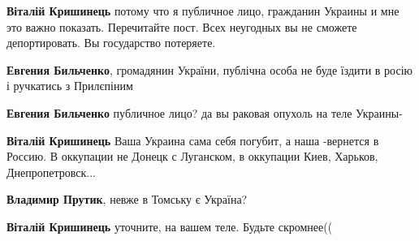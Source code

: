 \begin{itemize}
\begin{itemize}
\textbf{Віталій Кришинець} потому что я публичное лицо, гражданин Украины и мне это важно показать. Перечитайте пост. Всех неугодных вы не сможете депортировать. Вы государство потеряете.

 
\textbf{Евгения Бильченко}, громадянин України, публічна особа не буде їздити в росію і ручкатись з Прилєпіним

 
\textbf{Евгения Бильченко} публичное лицо? да вы раковая опухоль на теле Украины-

 
\textbf{Віталій Кришинець} Ваша Украина сама себя погубит, а наша -вернется в Россию. В оккупации не Донецк с Луганском, в оккупации Киев, Харьков, Днепропетровск...

 
\textbf{Владимир Прутик}, невже в Томську є Україна?

 
\textbf{Віталій Кришинець} уточните, на вашем теле. Будьте скромнее((

 

\end{itemize}
\end{itemize}
